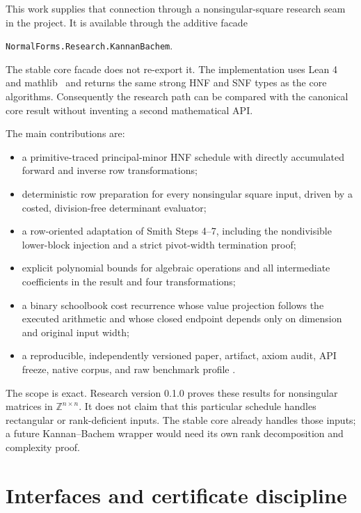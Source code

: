\documentclass[11pt]{article}
\newcommand{\code}[1]{\texttt{#1}}
\newcommand{\Z}{\mathbb{Z}}
\begin{document}
This work supplies that connection through a nonsingular-square research
seam in the project.  It is available through the additive facade
\begin{center}
\code{NormalForms.Research.KannanBachem}.
\end{center}
The stable core facade does not re-export it.  The implementation uses Lean 4
and mathlib~\citep{deMouraUllrich2021Lean4,mathlib2020} and returns the same strong HNF and SNF
types as the core algorithms.  Consequently the research path can be compared
with the canonical core result without inventing a second mathematical API.

The main contributions are:
\begin{itemize}
  \item a primitive-traced principal-minor HNF schedule with directly
        accumulated forward and inverse row transformations;
  \item deterministic row preparation for every nonsingular square input,
        driven by a costed, division-free determinant evaluator;
  \item a row-oriented adaptation of Smith Steps 4--7, including
        the nondivisible lower-block injection and a strict pivot-width
        termination proof;
  \item explicit polynomial bounds for algebraic operations and all
        intermediate coefficients in the result and four transformations;
  \item a binary schoolbook cost recurrence whose value projection follows
        the executed arithmetic and whose closed endpoint depends only on
        dimension and original input width;
  \item a reproducible, independently versioned paper, artifact, axiom audit,
        API freeze, native corpus, and raw benchmark profile
        \citep{ji2026normalforms}.
\end{itemize}

The scope is exact.  Research version 0.1.0 proves these results for
nonsingular matrices in \(\Z^{n\times n}\).  It does not claim that this
particular schedule handles rectangular or rank-deficient inputs.  The stable
core already handles those inputs; a future Kannan--Bachem wrapper would need
its own rank decomposition and complexity proof.

\section{Interfaces and certificate discipline}
\end{document}
